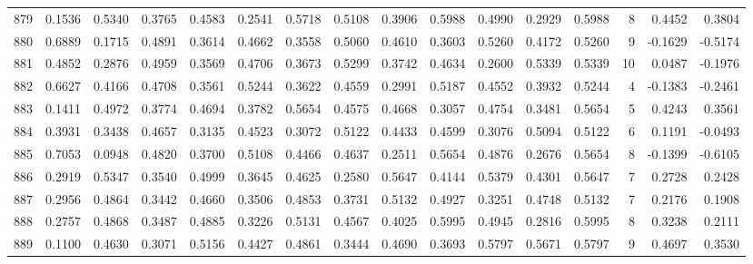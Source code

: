 \begin{tabular}{lrrrrrrrrrrrrrrr}
879 &      0.1536 &  0.5340 &  0.3765 &  0.4583 &  0.2541 &  0.5718 &  0.5108 &  0.3906 &  0.5988 &  0.4990 &   0.2929 &     0.5988 &      8 &                    0.4452 &                     0.3804 \\
880 &      0.6889 &  0.1715 &  0.4891 &  0.3614 &  0.4662 &  0.3558 &  0.5060 &  0.4610 &  0.3603 &  0.5260 &   0.4172 &     0.5260 &      9 &                   -0.1629 &                    -0.5174 \\
881 &      0.4852 &  0.2876 &  0.4959 &  0.3569 &  0.4706 &  0.3673 &  0.5299 &  0.3742 &  0.4634 &  0.2600 &   0.5339 &     0.5339 &     10 &                    0.0487 &                    -0.1976 \\
882 &      0.6627 &  0.4166 &  0.4708 &  0.3561 &  0.5244 &  0.3622 &  0.4559 &  0.2991 &  0.5187 &  0.4552 &   0.3932 &     0.5244 &      4 &                   -0.1383 &                    -0.2461 \\
883 &      0.1411 &  0.4972 &  0.3774 &  0.4694 &  0.3782 &  0.5654 &  0.4575 &  0.4668 &  0.3057 &  0.4754 &   0.3481 &     0.5654 &      5 &                    0.4243 &                     0.3561 \\
884 &      0.3931 &  0.3438 &  0.4657 &  0.3135 &  0.4523 &  0.3072 &  0.5122 &  0.4433 &  0.4599 &  0.3076 &   0.5094 &     0.5122 &      6 &                    0.1191 &                    -0.0493 \\
885 &      0.7053 &  0.0948 &  0.4820 &  0.3700 &  0.5108 &  0.4466 &  0.4637 &  0.2511 &  0.5654 &  0.4876 &   0.2676 &     0.5654 &      8 &                   -0.1399 &                    -0.6105 \\
886 &      0.2919 &  0.5347 &  0.3540 &  0.4999 &  0.3645 &  0.4625 &  0.2580 &  0.5647 &  0.4144 &  0.5379 &   0.4301 &     0.5647 &      7 &                    0.2728 &                     0.2428 \\
887 &      0.2956 &  0.4864 &  0.3442 &  0.4660 &  0.3506 &  0.4853 &  0.3731 &  0.5132 &  0.4927 &  0.3251 &   0.4748 &     0.5132 &      7 &                    0.2176 &                     0.1908 \\
888 &      0.2757 &  0.4868 &  0.3487 &  0.4885 &  0.3226 &  0.5131 &  0.4567 &  0.4025 &  0.5995 &  0.4945 &   0.2816 &     0.5995 &      8 &                    0.3238 &                     0.2111 \\
889 &      0.1100 &  0.4630 &  0.3071 &  0.5156 &  0.4427 &  0.4861 &  0.3444 &  0.4690 &  0.3693 &  0.5797 &   0.5671 &     0.5797 &      9 &                    0.4697 &                     0.3530 \\

\end{tabular}
